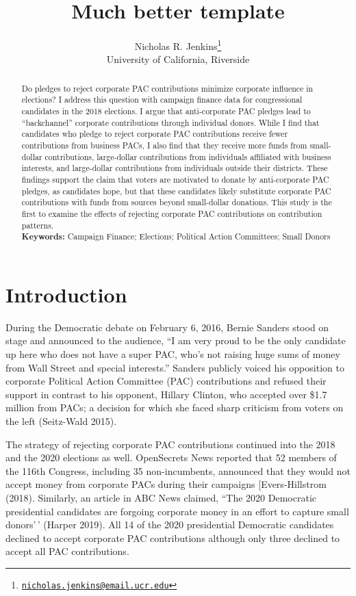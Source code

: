 \documentclass[
  12pt,
]{article}
\title{Much better template}
\author{Nicholas R. Jenkins\footnote{\href{mailto:nicholas.jenkins@email.ucr.edu}{\nolinkurl{nicholas.jenkins@email.ucr.edu}}}\\
University of California, Riverside}
\date{}
\begin{document}
\maketitle
\begin{abstract}
Do pledges to reject corporate PAC contributions minimize corporate influence in elections? I address this question with campaign finance data for congressional candidates in the 2018 elections. I argue that anti-corporate PAC pledges lead to ``backchannel'' corporate contributions through individual donors. While I find that candidates who pledge to reject corporate PAC contributions receive fewer contributions from business PACs, I also find that they receive more funds from small-dollar contributions, large-dollar contributions from individuals affiliated with business interests, and large-dollar contributions from individuals outside their districts. These findings support the claim that voters are motivated to donate by anti-corporate PAC pledges, as candidates hope, but that these candidates likely substitute corporate PAC contributions with funds from sources beyond small-dollar donations. This study is the first to examine the effects of rejecting corporate PAC contributions on contribution patterns.\\
\textbf{Keywords:} Campaign Finance; Elections; Political Action Committees; Small Donors
\end{abstract}

\newpage

\hypertarget{introduction}{%
\section{Introduction}\label{introduction}}

During the Democratic debate on February 6, 2016, Bernie Sanders stood on stage and announced to the audience, ``I am very proud to be the only candidate up here who does not have a super PAC, who's not raising huge sums of money from Wall Street and special interests.'' Sanders publicly voiced his opposition to corporate Political Action Committee (PAC) contributions and refused their support in contrast to his opponent, Hillary Clinton, who accepted over \$1.7 million from PACs; a decision for which she faced sharp criticism from voters on the left (Seitz-Wald 2015).

The strategy of rejecting corporate PAC contributions continued into the 2018 and the 2020 elections as well. OpenSecrets News reported that 52 members of the 116th Congress, including 35 non-incumbents, announced that they would not accept money from corporate PACs during their campaigns {[}Evers-Hillstrom (2018). Similarly, an article in ABC News claimed, ``The 2020 Democratic presidential candidates are forgoing corporate money in an effort to capture small donors'\,' (Harper 2019). All 14 of the 2020 presidential Democratic candidates declined to accept corporate PAC contributions although only three declined to accept all PAC contributions.
\end{document}
